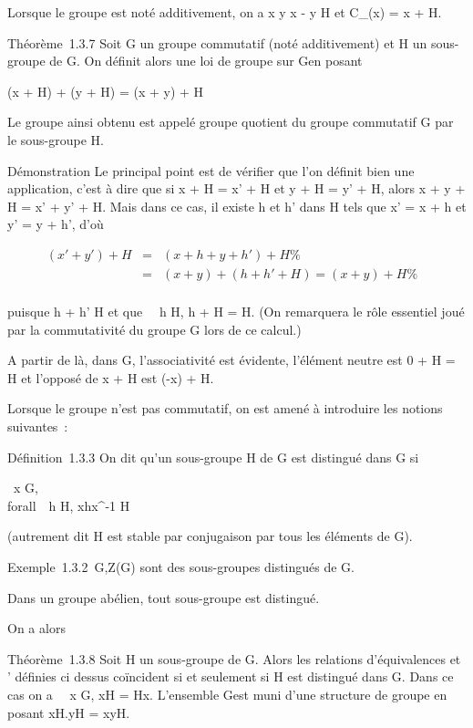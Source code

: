 Lorsque le groupe est noté additivement, on a x  y
\Leftrightarrow x - y \in H et C_(x) = x + H.

Théorème~1.3.7 Soit G un groupe commutatif (noté additivement) et H un
sous-groupe de G. On définit alors une loi de groupe sur G\diagupH en posant

(x + H) + (y + H) = (x + y) + H

Le groupe ainsi obtenu est appelé groupe quotient du groupe commutatif G
par le sous-groupe H.

Démonstration Le principal point est de vérifier que l'on définit bien
une application, c'est à dire que si x + H = x' + H et y + H = y' + H,
alors x + y + H = x' + y' + H. Mais dans ce cas, il existe h et h' dans
H tels que x' = x + h et y' = y + h', d'où

\begin{align*} (x' + y') + H& =& (x + h + y + h')
+ H \%& \\ & =& (x + y) + (h + h' + H)
= (x + y) + H\%& \\
\end{align*}

puisque h + h' \in H et que \forall~~h \in H, h + H = H.
(On remarquera le rôle essentiel joué par la commutativité du groupe G
lors de ce calcul.)

A partir de là, dans G\diagupH, l'associativité est évidente, l'élément neutre
est 0 + H = H et l'opposé de x + H est (-x) + H.

Lorsque le groupe n'est pas commutatif, on est amené à introduire les
notions suivantes~:

Définition~1.3.3 On dit qu'un sous-groupe H de G est distingué dans G si

\forall~x \in G,\\forall~~h \in H,
xhx^-1 \in H

(autrement dit H est stable par conjugaison par tous les éléments de G).

Exemple~1.3.2 \e\,G,Z(G) sont des
sous-groupes distingués de G.

Dans un groupe abélien, tout sous-groupe est distingué.

On a alors

Théorème~1.3.8 Soit H un sous-groupe de G. Alors les relations
d'équivalences  et ' définies ci dessus coïncident si et seulement si
H est distingué dans G. Dans ce cas on a \forall~~x \in
G, xH = Hx. L'ensemble G\diagupH est muni d'une structure de groupe en posant
xH.yH = xyH.

